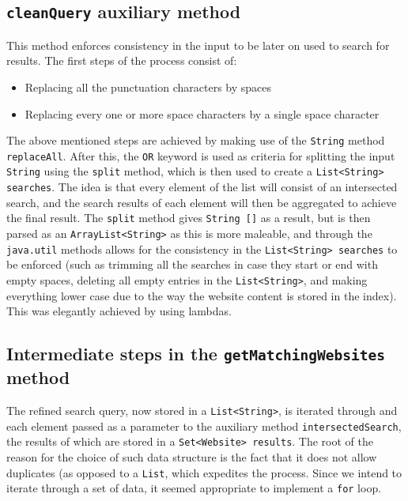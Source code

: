 \subsection{{\tt cleanQuery} auxiliary method}
This method enforces consistency in the input to be later on used to search for results.
The first steps of the process consist of:
\begin{itemize}
\item Replacing all the punctuation characters by spaces
\item Replacing every one or more space characters by a single space character
\end{itemize}
The above mentioned steps are achieved by making use of the {\tt String} method {\tt replaceAll}.
After this, the {\tt OR} keyword is used as criteria for splitting the input {\tt String} using the {\tt split} method, which is then used to create a {\tt List<String> searches}. The idea is that every element of the list will consist of an intersected search, and the search results of each element will then be aggregated to achieve the final result.
The {\tt split} method gives {\tt String []} as a result, but is then parsed as an {\tt ArrayList<String>} as this is more maleable, and through the {\tt java.util} methods allows for the consistency in the {\tt List<String> searches} to be enforced (such as trimming all the searches in case they start or end with empty spaces, deleting all empty entries in the {\tt List<String>}, and making everything lower case due to the way the website content is stored in the index). This was elegantly achieved by using lambdas.
\subsection{Intermediate steps in the {\tt getMatchingWebsites} method}
The refined search query, now stored in a {\tt List<String>}, is iterated through and each element passed as a parameter to the auxiliary method {\tt intersectedSearch}, the results of which are stored in a {\tt Set<Website> results}. The root of the reason for the choice of such data structure is the fact that it does not allow duplicates (as opposed to a {\tt List}, which expedites the process. Since we intend to iterate through a set of data, it seemed appropriate to implement a {\tt for} loop.
